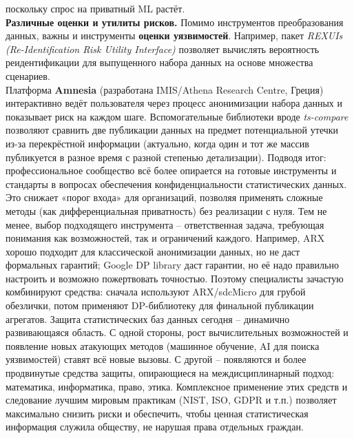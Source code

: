 поскольку спрос на приватный ML растёт.\\
\textbf{Различные оценки и утилиты рисков.}
Помимо инструментов преобразования данных, важны и инструменты \textbf{оценки уязвимостей}. Например, пакет \textit{REXUIs (Re-Identification Risk Utility Interface)} позволяет вычислять вероятность реидентификации для выпущенного набора данных на основе множества сценариев.\\
Платформа \textbf{Amnesia} (разработана IMIS/Athena Research Centre, Греция) интерактивно ведёт пользователя через процесс анонимизации набора данных
и показывает риск на каждом шаге. Вспомогательные библиотеки вроде \textit{ts-compare} позволяют сравнить две публикации
данных на предмет потенциальной утечки из-за перекрёстной информации (актуально, когда один и тот же массив публикуется
в разное время с разной степенью детализации). Подводя итог: профессиональное сообщество всё более опирается на готовые
инструменты и стандарты в вопросах обеспечения конфиденциальности статистических данных. Это снижает «порог входа» для
организаций, позволяя применять сложные методы (как дифференциальная приватность) без реализации с нуля. Тем не менее,
выбор подходящего инструмента – ответственная задача, требующая понимания как возможностей, так и ограничений каждого.
Например, ARX хорошо подходит для классической анонимизации данных, но не даст формальных гарантий; Google DP library
даст гарантии, но её надо правильно настроить и возможно пожертвовать точностью. Поэтому специалисты зачастую
комбинируют средства: сначала используют ARX/sdcMicro для грубой обезлички, потом применяют DP-библиотеку для финальной
публикации агрегатов. Защита статистических баз данных сегодня – динамично развивающаяся область. С одной стороны, рост
вычислительных возможностей и появление новых атакующих методов (машинное обучение, AI для поиска уязвимостей) ставят
всё новые вызовы. С другой – появляются и более продвинутые средства защиты, опирающиеся на междисциплинарный подход:
математика, информатика, право, этика. Комплексное применение этих средств и следование лучшим мировым практикам (NIST,
ISO, GDPR и т.п.) позволяет максимально снизить риски и обеспечить, чтобы ценная статистическая информация служила
обществу, не нарушая права отдельных граждан.